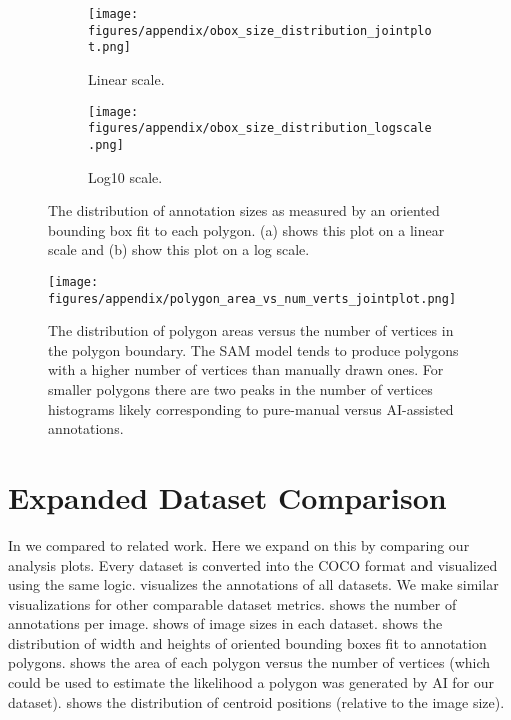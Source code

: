 \begin{figure}[ht]
\centering
\begin{subfigure}[b]{0.4\textwidth}
  \texttt{[image: figures/appendix/obox\_size\_distribution\_jointplot.png]}
  \caption{Linear scale.}
  \label{fig:annot_obox_size_dist_linear}
\end{subfigure}
\hfill
\begin{subfigure}[b]{0.4\textwidth}
  \texttt{[image: figures/appendix/obox\_size\_distribution\_logscale.png]}
  \caption{Log10 scale.}
  \label{fig:annot_obox_size_dist_log}
\end{subfigure}
\caption{The distribution of annotation sizes as measured by an oriented bounding box fit to each polygon. (a) shows this plot on a linear scale and (b) show this plot on a log scale.}
\label{fig:annot_obox_size_dist}
\end{figure}


\begin{figure}[ht]
\centering
\texttt{[image: figures/appendix/polygon\_area\_vs\_num\_verts\_jointplot.png]}
\caption[]{
    The distribution of polygon areas versus the number of vertices in the polygon boundary.
    The SAM model tends to produce polygons with a higher number of vertices
    than manually drawn ones.  For smaller polygons there are two peaks in the
    number of vertices histograms likely corresponding to pure-manual versus
    AI-assisted annotations.
}
\label{fig:annot_area_verts_distri}
\end{figure}


\section{Expanded Dataset Comparison}

In  we compared to related work. Here we expand on this
by comparing our analysis plots. Every dataset is converted into the COCO
format and visualized using the same logic. 
visualizes the annotations of all datasets. We make similar visualizations 
for other comparable dataset metrics.
 shows the number of annotations per image.
 shows of image sizes in each dataset.
 shows the distribution of width and heights of oriented bounding boxes fit to annotation polygons.
 shows the area of each polygon versus the number of vertices (which could be used to estimate the likelihood a polygon was generated by AI for our dataset).
 shows the distribution of centroid positions (relative to the image size).



